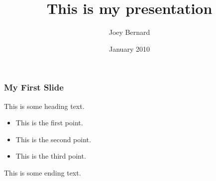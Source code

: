 \documentclass{beamer}
\title{This is my presentation}
\author{Joey Bernard}
\date{January 2010}
\begin{document}
\maketitle

\begin{frame}
   \frametitle{My First Slide}
   This is some heading text.
   \begin{itemize}
      \item This is the first point.
      \item This is the second point.
      \item This is the third point.
   \end{itemize}
   This is some ending text.
\end{frame}
\end{document}
